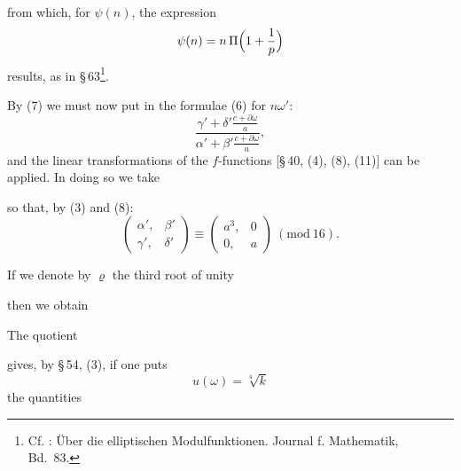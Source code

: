 from which, for $\psi(n)$, the expression
\[
\psi(n) = n\,\Pi\Bigl(1+\frac{1}{p}\Bigr)
\]
results, as in §\,63\footnote{Cf. : Über die
elliptischen Modulfunktionen. Journal f. Mathematik, Bd.\ 83.}.

By (7) we must now put in the formulae (6) for $n\omega'$:
\[
\frac{\displaystyle \gamma' + \delta'\frac{c+\partial\omega}{a}}{\displaystyle \alpha' + \beta'\frac{c+\partial\omega}{a}},
\]
and the linear transformations of the $f$-functions
[§\,40, (4), (8), (11)] can be applied. In doing so we take


so that, by (3) and (8):
\[
\begin{pmatrix} \alpha', & \beta' \\ \gamma', & \delta' \end{pmatrix} \equiv \begin{pmatrix} a^3, & 0 \\ 0, & a \end{pmatrix}\ (\mathrm{mod}\ 16).
\]

If we denote by $\varrho$ the third root of unity


then we obtain

The quotient


gives, by §\,54, (3), if one puts
\[
u(\omega) = \sqrt[4]{k}
\]
the quantities
